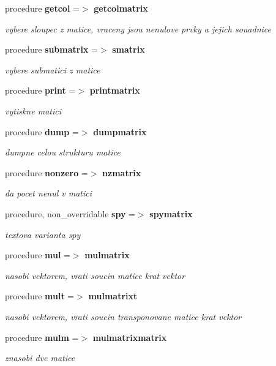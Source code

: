 \begin{DoxyCompactItemize}
procedure {\bf getcol} =$>$ {\bf getcolmatrix}
\begin{DoxyCompactList}\small\item\em vybere sloupec z matice, vraceny jsou nenulove prvky a jejich souadnice \end{DoxyCompactList}\item 
procedure {\bf submatrix} =$>$ {\bf smatrix}
\begin{DoxyCompactList}\small\item\em vybere submatici z matice \end{DoxyCompactList}\item 
procedure {\bf print} =$>$ {\bf printmatrix}
\begin{DoxyCompactList}\small\item\em vytiskne matici \end{DoxyCompactList}\item 
procedure {\bf dump} =$>$ {\bf dumpmatrix}
\begin{DoxyCompactList}\small\item\em dumpne celou strukturu matice \end{DoxyCompactList}\item 
procedure {\bf nonzero} =$>$ {\bf nzmatrix}
\begin{DoxyCompactList}\small\item\em da pocet nenul v matici \end{DoxyCompactList}\item 
procedure, non\+\_\+overridable {\bf spy} =$>$ {\bf spymatrix}
\begin{DoxyCompactList}\small\item\em textova varianta spy \end{DoxyCompactList}\item 
procedure {\bf mul} =$>$ {\bf mulmatrix}
\begin{DoxyCompactList}\small\item\em nasobi vektorem, vrati soucin matice krat vektor \end{DoxyCompactList}\item 
procedure {\bf mult} =$>$ {\bf mulmatrixt}
\begin{DoxyCompactList}\small\item\em nasobi vektorem, vrati soucin transponovane matice krat vektor \end{DoxyCompactList}\item 
procedure {\bf mulm} =$>$ {\bf mulmatrixmatrix}
\begin{DoxyCompactList}\small\item\em znasobi dve matice \end{DoxyCompactList}\item 

\end{DoxyCompactItemize}
